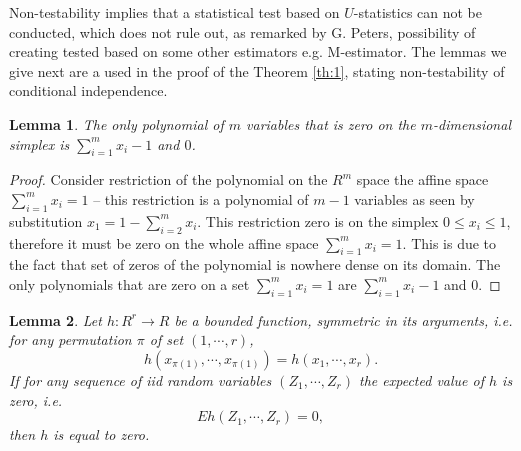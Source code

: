 \documentclass{article}
\newtheorem{lemma}{Lemma}
\begin{document}
Non-testability implies that a statistical test based on $U$-statistics can not be conducted, which does not rule out, as remarked by G. Peters, possibility of creating tested based on some other estimators e.g. M-estimator. The lemmas we give next are a used in the proof of the Theorem  \ref{th:1}, stating non-testability of conditional independence. 

\begin{lemma}
\label{lem:aha}
 The only polynomial of $m$ variables that is zero on the $m$-dimensional simplex is $\sum_{i=1}^m x_i-1$ and $0$.  
\end{lemma}
\begin{proof}
Consider restriction of the polynomial on the $R^m$ space  the affine space $\sum_{i=1}^m x_i=1$  -- this restriction is a polynomial of $m-1$ variables as seen by substitution $x_1 = 1 -\sum_{i=2}^m x_i$. This restriction zero is on the simplex $0 \leq x_i \leq 1$, therefore it must be zero on the whole affine space  $\sum_{i=1}^m x_i=1$. This is due to the fact that set of zeros of the polynomial is nowhere dense on its domain. The only polynomials that are zero on a set $\sum_{i=1}^m x_i=1$ are $\sum_{i=1}^m x_i-1$ and $0$.   
\end{proof}


\begin{lemma}
\label{the:Lemma}
Let $h: R^r \to R$ be a bounded function, symmetric in its arguments, i.e. for any permutation $\pi$ of set $(1,\cdots,r)$,
$$
h(x_{\pi(1)},\cdots,x_{\pi(1)}) = h(x_1,\cdots,x_r).   
$$
If for any sequence of iid random variables $(Z_1,\cdots,Z_r)$ the expected value of $h$ is zero, i.e.
$$
E h(Z_1,\cdots,Z_r) = 0,
$$
then $h$ is equal to zero.
\end{lemma}
\end{document}
